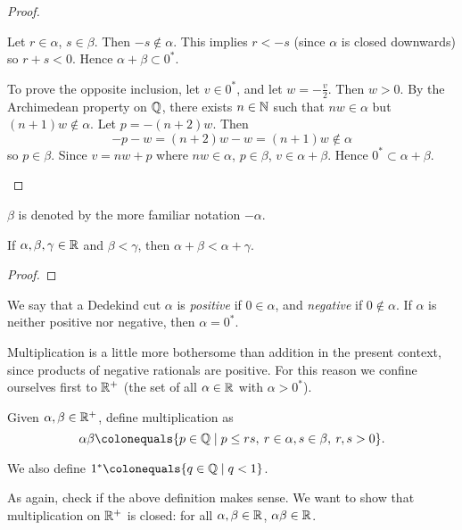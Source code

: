 \begin{proof}
\begin{enumerate}[label=(\roman*)]
Let $r\in\alpha$, $s\in\beta$. Then $-s\notin\alpha$. This implies $r<-s$ (since $\alpha$ is closed downwards) so $r+s<0$. Hence $\alpha+\beta\subset0^*$.

To prove the opposite inclusion, let $v\in0^*$, and let $w=-\frac{v}{2}$. Then $w>0$. By the Archimedean property on $\mathbb Q$, there exists $n\in\mathbb N$ such that $nw\in\alpha$ but $(n+1)w\notin\alpha$. Let $p=-(n+2)w$. Then
\[-p-w=(n+2)w-w=(n+1)w\notin\alpha\]
so $p\in\beta$. Since $v=nw+p$ where $nw\in\alpha$, $p\in\beta$, $v\in\alpha+\beta$. Hence $0^*\subset\alpha+\beta$.
\end{enumerate}
\end{proof}

\begin{notation}
$\beta$ is denoted by the more familiar notation $-\alpha$.
\end{notation}

\begin{lemma}
If $\alpha,\beta,\gamma\in\mathbb R$ and $\beta<\gamma$, then $\alpha+\beta<\alpha+\gamma$.
\end{lemma}

\begin{proof}

\end{proof}

We say that a Dedekind cut $\alpha$ is \emph{positive} if $0\in\alpha$, and \emph{negative} if $0\notin\alpha$. If $\alpha$ is neither positive nor negative, then $\alpha=0^*$.

Multiplication is a little more bothersome than addition in the present context, since products of negative rationals are positive. For this reason we confine ourselves first to $\mathbb R^+$ (the set of all $\alpha\in\mathbb R$ with $\alpha>0^*$).

\begin{definition}
Given $\alpha,\beta\in\mathbb R^+$, define multiplication as
\[\alpha\beta\colonequals\{p\in\QQ\mid p\le rs,\:r\in\alpha,s\in\beta,\:r,s>0\}.\]
\end{definition}

We also define $1^*\colonequals\{q\in\QQ\mid q<1\}$.

As again, check if the above definition makes sense. We want to show that multiplication on $\mathbb R^+$ is closed: for all $\alpha,\beta\in\mathbb R$, $\alpha\beta\in\mathbb R$.

